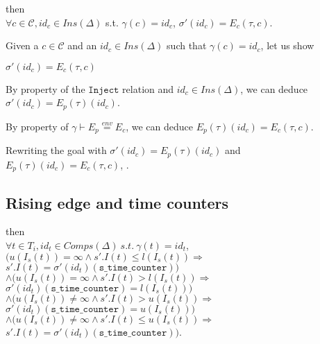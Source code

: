 \documentclass[dvipsnames,12pt]{article}
\begin{document}
\begin{lemma}
  \label{lem:re-equal-cond}
  \rehyps{} then\\
  $\forall{}c\in\mathcal{C},id_c\in{}Ins(\Delta)$
  s.t. $\gamma(c)=id_c$, $\sigma'(id_c)=E_c(\tau,c)$.
\end{lemma}

\begin{niproof}
  Given a $c\in\mathcal{C}$ and an $id_c\in{}Ins(\Delta)$ such that
  $\gamma(c)=id_c$, let us show
  \begin{frameb}
    $\sigma'(id_c)=E_c(\tau,c)$
  \end{frameb}

  By property of the $\mathtt{Inject}$ relation and
  $id_c\in{}Ins(\Delta)$, we can deduce
  $\sigma'(id_c)=E_p(\tau)(id_c)$.

  By property of $\gamma\vdash{}E_p\stackrel{env}{=}E_c$, we can
  deduce $E_p(\tau)(id_c)=E_c(\tau,c)$.

  Rewriting the goal with $\sigma'(id_c)=E_p(\tau)(id_c)$ and
  $E_p(\tau)(id_c)=E_c(\tau,c)$, .
\end{niproof}

\subsection{Rising edge and time counters}
\label{sec:re-tc}

\begin{lemma}
  \label{lem:re-equal-tc}
  \rehyps{} then\\
  $\forall{}t\in{}T_i,id_t\in{}Comps(\Delta)~s.t.~\gamma(t)=id_t$,\\
  $\big(u(I_s(t))=\infty\land{}s'.I(t)\le{}l(I_s(t))\Rightarrow$
  $s'.I(t)=\sigma'(id_t)(\texttt{s\_time\_counter})\big)$\\
  $\land\big(u(I_s(t))=\infty\land{}s'.I(t)>{}l(I_s(t))\Rightarrow$
  $\sigma'(id_t)(\texttt{s\_time\_counter})=l(I_s(t))\big)$\\
  $\land\big(u(I_s(t))\neq\infty\land{}s'.I(t)>{}u(I_s(t))\Rightarrow$
  $\sigma'(id_t)(\texttt{s\_time\_counter})=u(I_s(t))\big)$\\
  $\land\big(u(I_s(t))\neq\infty\land{}s'.I(t)\le{}u(I_s(t))\Rightarrow$
  $s'.I(t)=\sigma'(id_t)(\texttt{s\_time\_counter})\big)$.
\end{lemma}
\end{document}
